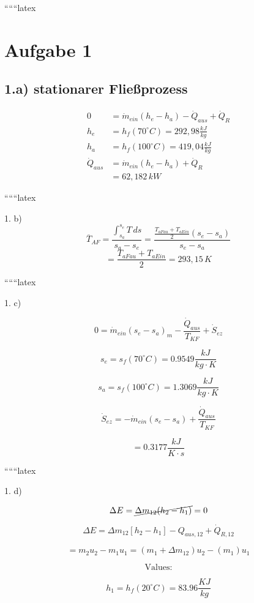 
``````latex


\section*{Aufgabe 1}

\subsection*{1.a) stationarer Fließprozess}

\begin{align*}
0 &= \dot{m}_{ein} \left( h_e - h_a \right) - \dot{Q}_{aus} + \dot{Q}_R \\
h_e &= h_f \left( 70^\circ C \right) = 292,98 \frac{kJ}{kg} \\
h_a &= h_f \left( 100^\circ C \right) = 419,04 \frac{kJ}{kg} \\
\dot{Q}_{aus} &= \dot{m}_{ein} \left( h_e - h_a \right) + \dot{Q}_R \\
&= 62,182 \, kW
\end{align*}

``````latex

1. b)
\[
\overline{T}_{AF} = \frac{\int_{s_a}^{s_e} T \, ds}{s_a - s_e} = \frac{\frac{T_{aFau} + T_{aEin}}{2} (s_e - s_a)}{s_e - s_a}
\]
\[
= \frac{T_{aFau} + T_{aEin}}{2} = 293,15 \, K
\]

``````latex


1. c)

\[
0 = \dot{m}_{ein} (s_e - s_a)_{m} - \frac{\dot{Q}_{aus}}{T_{KF}} + \dot{S}_{ez}
\]

\[
s_e = s_f (70^\circ C) = 0.9549 \frac{kJ}{kg \cdot K}
\]

\[
s_a = s_f (100^\circ C) = 1.3069 \frac{kJ}{kg \cdot K}
\]

\[
\dot{S}_{ez} = -\dot{m}_{ein} (s_e - s_a) + \frac{\dot{Q}_{aus}}{T_{KF}}
\]

\[
= 0.3177 \frac{kJ}{K \cdot s}
\]

``````latex

1. d)

\[
\Delta E = \cancel{\Delta m_{12} (h_2 - h_1)} = 0
\]

\[
\Delta E = \Delta m_{12} \left[ h_2 - h_1 \right] - Q_{aus, 12} + \dot{Q}_{R, 12}
\]

\[
= m_2 u_2 - m_1 u_1 = (m_1 + \Delta m_{12}) u_2 - (m_1) u_1
\]

\[
\text{Values:}
\]

\[
h_1 = h_f (20^\circ C) = 83.96 \frac{KJ}{kg}
\]

